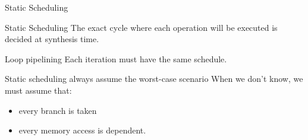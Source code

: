 \documentclass[page number]{beamer}
\begin{document}
\begin{frame}{Static Scheduling}
  \begin{alertblock}{Static Scheduling}
    The exact cycle where each operation will be executed is decided at synthesis time.
  \end{alertblock}
  \vfill
  \begin{block}{Loop pipelining}
    Each iteration must have the same schedule.
  \end{block}
  \vfill
  \begin{alertblock}{Static scheduling always assume the worst-case scenario}
    When we don't know, we must assume that:
    \begin{itemize}
    \item every branch is taken
    \item every memory access is dependent.
    \end{itemize}
  \end{alertblock}
\end{frame}

\end{document}
